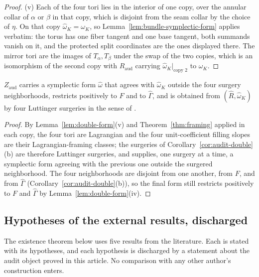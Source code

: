 \begin{proof}
(v) Each of the four tori lies in the interior of one copy, over the
annular collar of $\alpha$ or $\beta$ in that copy, which is disjoint from
the seam collar by the choice of $\eta$.  On that copy $\hat\omega_K=\omega_K$,
so Lemma~\ref{lem:bundle-symplectic-form} applies verbatim: the torus has
one fiber tangent and one base tangent, both summands vanish on it, and the
protected split coordinates are the ones displayed there.  The mirror tori
are the images of $T_\alpha,T_\beta$ under the swap of the two copies, which
is an isomorphism of the second copy with $R_{\mathrm{aud}}$ carrying
$\hat\omega_K|_{\text{copy }2}$ to $\omega_K$.
\end{proof}

\begin{corollary}\label{cor:Z-symplectic}
$Z_{\mathrm{aud}}$ carries a symplectic form $\hat\omega$ that agrees with
$\hat\omega_K$ outside the four surgery neighborhoods, restricts positively
to $F$ and to $\hat\Gamma$, and is obtained from $(\hat R,\hat\omega_K)$ by
four Luttinger surgeries in the sense of \cite[Definition~2.1]{ADK}.
\end{corollary}

\begin{proof}
By Lemma~\ref{lem:double-form}(v) and Theorem~\ref{thm:framing} applied in
each copy, the four tori are Lagrangian and the four unit-coefficient filling
slopes are their Lagrangian-framing classes; the surgeries of
Corollary~\ref{cor:audit-double}(b) are therefore Luttinger surgeries, and
\cite[Proposition~2.2]{ADK} supplies, one surgery at a time, a symplectic
form agreeing with the previous one outside the surgered neighborhood.  The
four neighborhoods are disjoint from one another, from $F$, and from
$\hat\Gamma$ (Corollary~\ref{cor:audit-double}(b)), so the final form still
restricts positively to $F$ and $\hat\Gamma$ by Lemma~\ref{lem:double-form}(iv).
\end{proof}

\subsection{Hypotheses of the external results, discharged}
\label{sec:external-hypotheses}

The existence theorem below uses five results from the literature.  Each is
stated with its hypotheses, and each hypothesis is discharged by a statement
about the audit object proved in this article.  No comparison with any
other author's construction enters.

